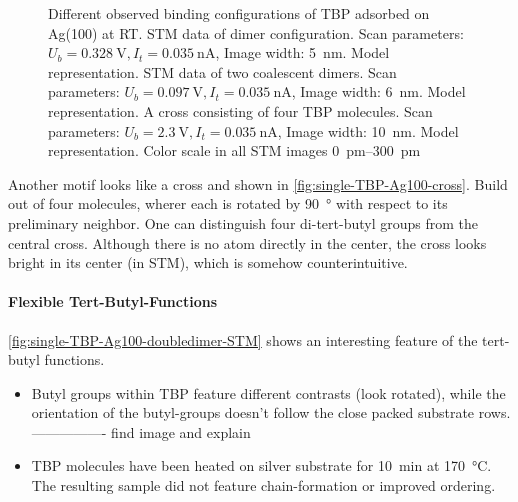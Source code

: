 \begin{figure}[]
{	\label{fig:single-TBP-Ag100-cross-model}
	}
	\caption{Different observed binding configurations of TBP adsorbed on Ag(100) at RT.  STM data of dimer configuration. Scan parameters: $U_b=\SI{0.328}{\volt}, I_t=\SI{0.035}{\nano \ampere}$, Image width: \SI{5}{\nm}.  Model representation.  STM data of two coalescent dimers. Scan parameters: $U_b=\SI{0.097}{\volt}, I_t=\SI{0.035}{\nano \ampere}$, Image width: \SI{6}{\nm}.  Model representation.  A cross consisting of four TBP molecules. Scan parameters: $U_b=\SI{2.3}{\volt}, I_t=\SI{0,035}{\nano \ampere}$, Image width: \SI{10}{\nm}.  Model representation. Color scale in all STM images \SIrange{0}{300}{\pico\meter}}
	\label{fig:single-TBP-Ag100-doubledimer}
\end{figure}
Another motif looks like a cross and shown in \autoref{fig:single-TBP-Ag100-cross}. Build out of four molecules, wherer each is rotated by \SI{90}{\degree} with respect to its preliminary neighbor. One can distinguish four di-tert-butyl groups from the central cross. Although there is no atom directly in the center, the cross looks bright in its center (in STM), which is somehow counterintuitive. 

%

\paragraph{Flexible Tert-Butyl-Functions}
\autoref{fig:single-TBP-Ag100-doubledimer-STM} shows an interesting feature of the tert-butyl functions.

\begin{itemize}
 \item Butyl groups within TBP feature different contrasts (look rotated), while the orientation of the butyl-groups doesn't follow the close packed substrate rows. ---------------- find image and explain
 \item TBP molecules have been heated on silver substrate for \SI{10}{\minute} at \SI{170}{\celsius}. The resulting sample did not feature chain-formation or improved ordering.
\end{itemize}

